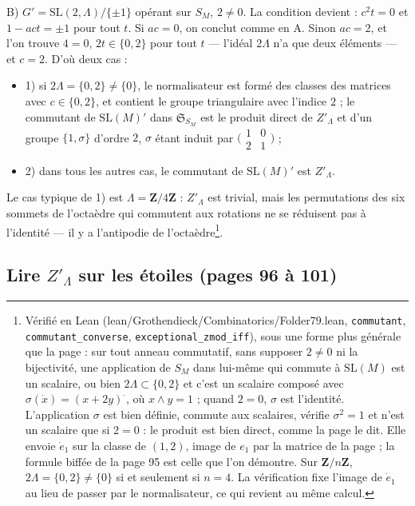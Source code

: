 \documentclass[11pt,a4paper]{article}
\begin{document}
B) $G' = \mathrm{SL}(2, \Lambda)/\{\pm 1\}$ opérant sur $S_M$, $2 \neq 0$. La
condition devient : $c^2 t = 0$ et $1 - act = \pm 1$ pour tout $t$. Si $ac = 0$,
on conclut comme en A. Sinon $ac = 2$, et l'on trouve $4 = 0$, $2t \in \{0,
2\}$ pour tout $t$ --- l'idéal $2\Lambda$ n'a que deux éléments --- et $c = 2$.
D'où deux cas :
\begin{itemize}
  \item 1) si $2\Lambda = \{0, 2\} \neq \{0\}$, le normalisateur est formé des
    classes des matrices avec $c \in \{0, 2\}$, et contient le groupe
    triangulaire avec l'indice $2$ ; le commutant de $\mathrm{SL}(M)'$ dans
    $\mathfrak{S}_{S_M}$ est le produit direct de $Z'_\Lambda$ et d'un groupe
    $\{1, \sigma\}$ d'ordre $2$, $\sigma$ étant induit par
    $\bigl(\begin{smallmatrix} 1 & 0 \\ 2 & 1 \end{smallmatrix}\bigr)$ ;
  \item 2) dans tous les autres cas, le commutant de $\mathrm{SL}(M)'$ est
    $Z'_\Lambda$.
\end{itemize}
Le cas typique de 1) est $\Lambda = \mathbf{Z}/4\mathbf{Z}$ : $Z'_\Lambda$ est
trivial, mais les permutations des six sommets de l'octaèdre qui commutent aux
rotations ne se réduisent pas à l'identité --- il y a l'antipodie de
l'octaèdre\footnote{Vérifié en Lean (lean/Grothendieck/Combinatorics/Folder79.lean,
\texttt{commutant}, \texttt{commutant\_converse},
\texttt{exceptional\_zmod\_iff}), sous une forme plus générale que la page :
sur tout anneau commutatif, sans supposer $2 \neq 0$ ni la bijectivité, une
application de $S_M$ dans lui-même qui commute à $\mathrm{SL}(M)$ est un
scalaire, ou bien $2\Lambda \subset \{0, 2\}$ et c'est un scalaire composé avec
$\sigma(\dot x) = (x + 2y)^{\cdot}$, où $x \wedge y = 1$ ; quand $2 = 0$,
$\sigma$ est l'identité. L'application $\sigma$ est bien définie, commute aux
scalaires, vérifie $\sigma^2 = 1$ et n'est un scalaire que si $2 = 0$ : le
produit est bien direct, comme la page le dit. Elle envoie $\dot e_1$ sur la
classe de $(1, 2)$, image de $e_1$ par la matrice de la page ; la formule
biffée de la page 95 est celle que l'on démontre. Sur $\mathbf{Z}/n\mathbf{Z}$,
$2\Lambda = \{0, 2\} \neq \{0\}$ si et seulement si $n = 4$. La vérification
fixe l'image de $\dot e_1$ au lieu de passer par le normalisateur, ce qui
revient au même calcul.}.

\subsection*{Lire $Z'_\Lambda$ sur les étoiles (pages 96 à 101)}
\end{document}
